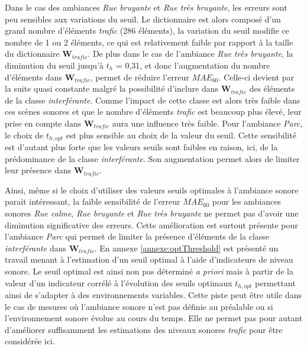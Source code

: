 Dans le cas des ambiances \textit{Rue bruyante} et \textit{Rue très bruyante}, les erreurs sont peu sensibles aux variations du seuil. Le dictionnaire est alors composé d'un grand nombre d'éléments \textit{trafic} (286 éléments), la variation du seuil modifie ce nombre de 1 ou 2 éléments, ce qui est relativement faible par rapport à la taille du dictionnaire $\mathbf{W}_{trafic}$. 
De plus dans le cas de l'ambiance \textit{Rue très bruyante}, la diminution du seuil jusqu'à $t_h$ = 0,31, et donc l'augmentation du nombre d'éléments dans $\mathbf{W}_{trafic}$, permet de réduire l'erreur $MAE_{60}$. Celle-ci devient par la suite quasi constante malgré la possibilité d'inclure dans $\mathbf{W}_{trafic}$ des éléments de la classe \textit{interférante}. 
Comme l'impact de cette classe est alors très faible dans ces scènes sonores et que le nombre d'éléments \textit{trafic} est beaucoup plus élevé, leur prise en compte dans $\mathbf{W}_{trafic}$ aura une influence très faible. 
Pour l'ambiance \textit{Parc}, le choix de $t_{h,opt}$ est plus sensible au choix de la valeur du seuil. Cette sensibilité est d'autant plus forte que les valeurs seuils sont faibles en raison, ici, de la prédominance de la classe \textit{interférante}. Son augmentation permet alors de limiter leur présence dans $\mathbf{W}_{trafic}$.

Ainsi, même si le choix d'utiliser des valeurs seuils optimales à l'ambiance sonore parait intéressant, la faible sensibilité de l'erreur $MAE_{60}$ pour les ambiances sonores \textit{Rue calme}, \textit{Rue bruyante} et \textit{Rue très bruyante} ne permet pas d'avoir une diminution significative des erreurs. Cette amélioration est surtout présente pour l'ambiance \textit{Parc} qui permet de limiter la présence d'éléments de la classe \textit{interférante} dans $\mathbf{W}_{trafic}$.
En annexe \ref{annexe:optThreshold} est présenté un travail menant à l'estimation d'un seuil optimal à l'aide d'indicateurs de niveau sonore. Le seuil optimal est ainsi non pas déterminé \textit{a priori} mais à partir de la valeur d'un indicateur corrélé à l'évolution des seuils optimaux $t_{h,opt}$ permettant ainsi de s'adapter à des environnements variables. Cette piste peut être utile dans le cas de mesures où l'ambiance sonore n'est pas définie au préalable ou si l'environnement sonore évolue au cours du temps. Elle ne permet pas pour autant d'améliorer suffisamment les estimations des niveaux sonores \textit{trafic} pour être considérée ici.

